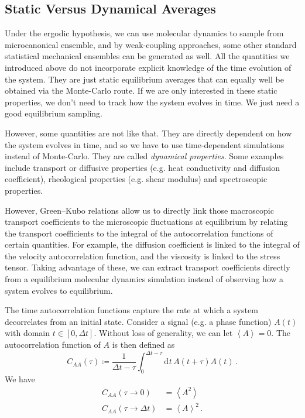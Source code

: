 \documentclass{article}
\theoremstyle{plain}\theoremheaderfont{\normalfont\itshape}\theorembodyfont{\rmfamily}\theoremseparator{.}\newtheorem*{rem}{Remark}\newtheorem*{ex}{Example}\newtheorem*{proof}{Proof}\newtheorem*{altp}{Alternative proof}
\theoremstyle{plain}\theoremheaderfont{\normalfont\bfseries}\theorembodyfont{\rmfamily}\theoremseparator{.}\newtheorem{thm}{Theorem}[section]\newtheorem{lem}[thm]{Lemma}\newtheorem{prop}[thm]{Proposition}\newtheorem*{cor}{Corollary}\newtheorem{defn}[thm]{Definition}\newtheorem{clm}[thm]{Claim}\newtheorem{clminproof}{Claim}\newtheorem{alg}[thm]{Algorithm}\newtheorem{hyp}[thm]{Hypothesis}\newtheorem{law}[thm]{Law}
\theoremstyle{break}\theoremheaderfont{\normalfont\itshape}\theorembodyfont{\rmfamily}\theoremseparator{.\medskip}\newtheorem*{proofskip}{Proof}\newtheorem*{exs}{Examples}\newtheorem*{rems}{Remarks}
\theoremstyle{break}\theoremheaderfont{\normalfont\bfseries}\theorembodyfont{\rmfamily}\theoremseparator{.\medskip}\newtheorem{lemskip}[thm]{Lemma}\newtheorem{defnskip}[thm]{Definition}\newtheorem{propskip}[thm]{Proposition}\newtheorem{thmskip}[thm]{Theorem}
\numberwithin{equation}{section}
\newcommand{\dd}[2][]{\mathrm{d}^{#1} #2\,}
\newcommand{\eval}[1]{\left\langle #1 \right\rangle}
\begin{document}
    \subsection{Static Versus Dynamical Averages}
    Under the ergodic hypothesis, we can use molecular dynamics to sample from microcanonical ensemble, and by weak-coupling approaches, some other standard statistical mechanical ensembles can be generated as well. All the quantities we introduced above do not incorporate explicit knowledge of the time evolution of the system. They are just static equilibrium averages that can equally well be obtained via the Monte-Carlo route. If we are only interested in these static properties, we don't need to track how the system evolves in time. We just need a good equilibrium sampling.

    However, some quantities are not like that. They are directly dependent on how the system evolves in time, and so we have to use time-dependent simulations instead of Monte-Carlo. They are called \textit{dynamical properties}. Some examples include transport or diffusive properties (e.g. heat conductivity and diffusion coefficient), rheological properties (e.g. shear modulus) and spectroscopic properties.

    However, Green--Kubo relations allow us to directly link those macroscopic transport coefficients to the microscopic fluctuations at equilibrium by relating the transport coefficients to the integral of the autocorrelation functions of certain quantities. For example, the diffusion coefficient is linked to the integral of the velocity autocorrelation function, and the viscosity is linked to the stress tensor. Taking advantage of these, we can extract transport coefficients directly from a equilibrium molecular dynamics simulation instead of observing how a system evolves to equilibrium.

    The time autocorrelation functions capture the rate at which a system decorrelates from an initial state. Consider a signal (e.g. a phase function) \(A(t)\) with domain \(t\in[0,\Delta t]\). Without loss of generality, we can let \(\eval{A}=0\). The autocorrelation function of \(A\) is then defined as
    \begin{equation}
        C_{AA}(\tau)\coloneqq\frac{1}{\Delta t-\tau}\int_{0}^{\Delta t-\tau}\dd{t}A(t+\tau)A(t)\,.
    \end{equation}
    We have
    \begin{align}
        C_{AA}(\tau\to 0)&=\eval{A^2}\\
        C_{AA}(\tau\to\Delta t)&=\eval{A}^2\,.
    \end{align}
\end{document}
